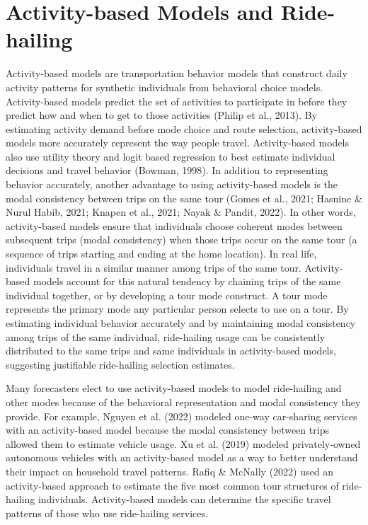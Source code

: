 \documentclass[simple, masters, twoside]{byuthesis}
\begin{document}
\hypertarget{lit-abm}{%
\section{Activity-based Models and Ride-hailing}\label{lit-abm}}

Activity-based models are transportation behavior models that construct daily activity patterns for synthetic individuals from behavioral choice models. Activity-based models predict the set of activities to participate in before they predict how and when to get to those activities (Philip et al., 2013). By estimating activity demand before mode choice and route selection, activity-based models more accurately represent the way people travel. Activity-based models also use utility theory and logit based regression to best estimate individual decisions and travel behavior (Bowman, 1998). In addition to representing behavior accurately, another advantage to using activity-based models is the modal consistency between trips on the same tour (Gomes et al., 2021; Hasnine \& Nurul Habib, 2021; Knapen et al., 2021; Nayak \& Pandit, 2022). In other words, activity-based models ensure that individuals choose coherent modes between subsequent trips (modal consistency) when those trips occur on the same tour (a sequence of trips starting and ending at the home location). In real life, individuals travel in a similar manner among trips of the same tour. Activity-based models account for this natural tendency by chaining trips of the same individual together, or by developing a tour mode construct. A tour mode represents the primary mode any particular person selects to use on a tour. By estimating individual behavior accurately and by maintaining modal consistency among trips of the same individual, ride-hailing usage can be consistently distributed to the same trips and same individuals in activity-based models, suggesting justifiable ride-hailing selection estimates.

Many forecasters elect to use activity-based models to model ride-hailing and other modes because of the behavioral representation and modal consistency they provide. For example, Nguyen et al. (2022) modeled one-way car-sharing services with an activity-based model because the modal consistency between trips allowed them to estimate vehicle usage. Xu et al. (2019) modeled privately-owned autonomous vehicles with an activity-based model as a way to better understand their impact on household travel patterns. Rafiq \& McNally (2022) used an activity-based approach to estimate the five most common tour structures of ride-hailing individuals. Activity-based models can determine the specific travel patterns of those who use ride-hailing services.
\end{document}
